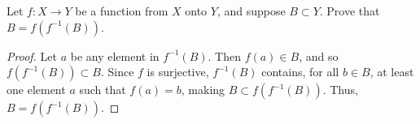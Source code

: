 \setcounter{question}{11}  %
\begin{question}[Macula]
Let $f: X \rightarrow Y$ be a function from $X$ onto $Y$, and suppose $B \subset Y$. Prove that $B = f(f^{-1}(B))$.
\end{question}

\begin{proof}
Let $a$ be any element in $f^{-1}(B)$. Then $f(a) \in B$, and so $f(f^{-1}(B)) \subset B$. Since $f$ is surjective, $f^{-1}(B)$ contains, for all $b \in B$, at least one element $a$ such that $f(a) = b$, making $B \subset f(f^{-1}(B))$. Thus, $B = f(f^{-1}(B))$.
\end{proof}


